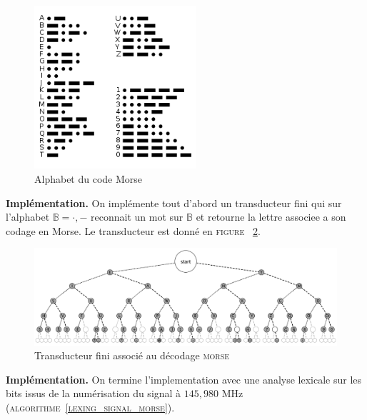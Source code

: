 \documentclass[twocolumn,pre,floats,aps,amsmath,amssymb]{revtex4}
\begin{document}
\begin{figure}[h]
  \includegraphics[width=6cm]{pictures/morse.png}
\caption{Alphabet du code Morse}
\label{fig:morse}
\end{figure}

\textbf{Impl\'ementation.} On impl\'emente tout d'abord un transducteur fini qui sur l'alphabet $\mathbb{B} = {\cdot, -}$ reconnait un mot sur $\mathbb{B}$ et retourne la lettre associee a son codage en Morse. Le transducteur est donn\'e en \textsc{figure} ~\ref{fig:transducteur_morse}.

\begin{figure}
  \includegraphics[width=17cm]{pictures/Morse_code_tree3.png}
\caption{Transducteur fini associ\'e au d\'ecodage \textsc{morse}~\cite{copyright_transducteur_morse}}
\label{fig:transducteur_morse}
\end{figure}

\textbf{Impl\'ementation.} On termine l'implementation avec une analyse lexicale sur les bits issus de la num\'erisation du signal \`a $145,980$ MHz (\textsc{algorithme~\ref{lexing_signal_morse}}).
\end{document}
